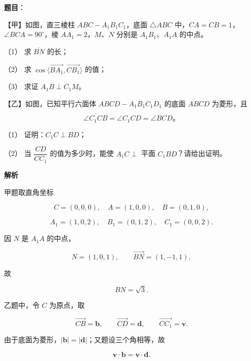 \begin{answer}

\textbf{题目}：

【甲】如图，直三棱柱 $ABC-A_1B_1C_1$，底面 $\triangle ABC$ 中，$CA=CB=1$，$\angle BCA=90^\circ$，棱 $AA_1=2$，$M$、$N$ 分别是 $A_1B_1$、$A_1A$ 的中点。
\nopagebreak[4]
\begin{center}\end{center}
\nopagebreak[4]
（1） 求 $\overline{BN}$ 的长；

（2） 求 $\cos\langle\overrightarrow{BA_1},\overrightarrow{CB_1}\rangle$ 的值；

（3） 求证 $A_1B\perp C_1M$。

【乙】如图，已知平行六面体 $ABCD-A_1B_1C_1D_1$ 的底面 $ABCD$ 为菱形，且

\nopagebreak[4]
\[
\angle C_1CB=\angle C_1CD=\angle BCD。
\]
\nopagebreak[4]
\begin{center}\end{center}
\nopagebreak[4]
（1） 证明：$C_1C\perp BD$；

（2） 当 $\dfrac{CD}{CC_1}$ 的值为多少时，能使 $A_1C\perp$ 平面 $C_1BD$？请给出证明。

\textbf{解析}


甲题取直角坐标

\nopagebreak[4]
\[
C=(0,0,0),\quad A=(1,0,0),\quad B=(0,1,0),
\]

\nopagebreak[4]
\[
A_1=(1,0,2),\quad B_1=(0,1,2),\quad C_1=(0,0,2).
\]

因 $N$ 是 $A_1A$ 的中点，

\nopagebreak[4]
\[
N=(1,0,1),
\qquad
\overrightarrow{BN}=(1,-1,1),
\]

故

\nopagebreak[4]
\[
BN=\sqrt3.
\]

乙题中，令 $C$ 为原点，取

\nopagebreak[4]
\[
\overrightarrow{CB}=\mathbf b,\qquad
\overrightarrow{CD}=\mathbf d,\qquad
\overrightarrow{CC_1}=\mathbf v.
\]

由于底面为菱形，$|\mathbf b|=|\mathbf d|$；又题设三个角相等，故

\nopagebreak[4]
\[
\mathbf v\cdot\mathbf b=\mathbf v\cdot\mathbf d.
\]


\end{answer}
